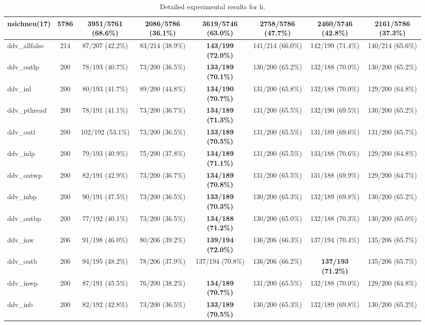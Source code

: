 \begin{landscape}
\begin{table}[h]
{\begin{tabular}[a]{|lc||c|c||c|c||c|c|}
nsichneu(17)      & 5786 & \textbf{3951/5761 (68.6\%)} & 2086/5786 (36.1\%) & 3619/5746 (63.0\%) & 2758/5786 (47.7\%) &  2460/5746 (42.8\%) & 2161/5786 (37.3\%)  \\
\hline
ddv\_allfalse  &  214 &   87/207  (42.2\%) &   83/214  (38.9\%) & \textbf{ 143/199  (72.0\%)} &  141/214  (66.0\%) &    142/199  (71.4\%) &  140/214  (65.6\%)  \\
ddv\_outlp     &  200 &   78/193  (40.7\%) &   73/200  (36.5\%) & \textbf{ 133/189  (70.1\%)} &  130/200  (65.2\%) &    132/188  (70.0\%) &  130/200  (65.2\%)  \\
ddv\_inl       &  200 &   80/193  (41.7\%) &   89/200  (44.8\%) & \textbf{ 134/190  (70.7\%)} &  131/200  (65.8\%) &    132/188  (70.0\%) &  129/200  (64.8\%)  \\
ddv\_pthread   &  200 &   78/191  (41.1\%) &   73/200  (36.7\%) & \textbf{ 134/189  (71.3\%)} &  131/200  (65.5\%) &    132/190  (69.5\%) &  130/200  (65.2\%)  \\
ddv\_outl      &  200 &  102/192  (53.1\%) &   73/200  (36.5\%) & \textbf{ 133/189  (70.5\%)} &  131/200  (65.5\%) &    131/189  (69.6\%) &  131/200  (65.7\%)  \\
ddv\_inlp      &  200 &   79/193  (40.9\%) &   75/200  (37.8\%) & \textbf{ 134/189  (71.1\%)} &  131/200  (65.5\%) &    133/188  (70.6\%) &  129/200  (64.8\%)  \\
ddv\_outwp     &  200 &   82/191  (42.9\%) &   73/200  (36.7\%) & \textbf{ 134/189  (70.8\%)} &  131/200  (65.5\%) &    131/188  (69.9\%) &  129/200  (64.7\%)  \\
ddv\_inbp      &  200 &   90/191  (47.5\%) &   73/200  (36.5\%) & \textbf{ 133/189  (70.3\%)} &  130/200  (65.3\%) &    132/189  (69.8\%) &  130/200  (65.2\%)  \\
ddv\_outbp     &  200 &   77/192  (40.1\%) &   73/200  (36.5\%) & \textbf{ 134/188  (71.2\%)} &  130/200  (65.0\%) &    132/188  (70.3\%) &  130/200  (65.0\%)  \\
ddv\_inw       &  206 &   91/198  (46.0\%) &   80/206  (39.2\%) & \textbf{ 139/194  (72.0\%)} &  136/206  (66.3\%) &    137/194  (70.4\%) &  135/206  (65.7\%)  \\
ddv\_outb      &  206 &   94/195  (48.2\%) &   78/206  (37.9\%) &  137/194  (70.8\%) &  136/206  (66.2\%) &   \textbf{ 137/193  (71.2\%)} &  135/206  (65.7\%)  \\
ddv\_inwp      &  200 &   87/191  (45.5\%) &   76/200  (38.2\%) & \textbf{ 134/189  (70.7\%)} &  131/200  (65.5\%) &    132/188  (70.0\%) &  129/200  (64.8\%)  \\
ddv\_inb       &  200 &   82/192  (42.8\%) &   73/200  (36.5\%) & \textbf{ 133/189  (70.5\%)} &  130/200  (65.3\%) &    132/189  (69.8\%) &  130/200  (65.2\%)  \\

\hline
  \end{tabular}}
  \caption{Detailed experimental results for  h.}
  \label{tab:exp1h_d}
\end{table}
\end{landscape}





